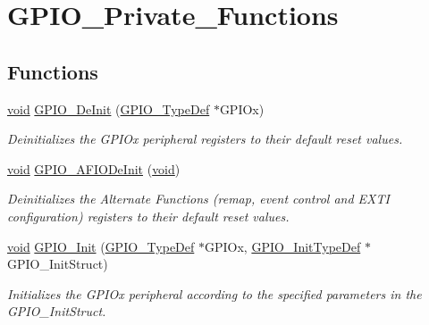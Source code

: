 \hypertarget{group___g_p_i_o___private___functions}{}\section{G\+P\+I\+O\+\_\+\+Private\+\_\+\+Functions}
\label{group___g_p_i_o___private___functions}
\subsection*{Functions}
\begin{DoxyCompactItemize}
\item 
\hyperlink{usb__devapi_8h_afabf60e7f57651d6d595a02c75f07cd0}{void} \hyperlink{group___g_p_i_o___private___functions_gaa60bdf3182c44b5fa818f237042f52ee}{G\+P\+I\+O\+\_\+\+De\+Init} (\hyperlink{struct_g_p_i_o___type_def}{G\+P\+I\+O\+\_\+\+Type\+Def} $\ast$G\+P\+I\+Ox)
\begin{DoxyCompactList}\small\item\em Deinitializes the G\+P\+I\+Ox peripheral registers to their default reset values. \end{DoxyCompactList}\item 
\hyperlink{usb__devapi_8h_afabf60e7f57651d6d595a02c75f07cd0}{void} \hyperlink{group___g_p_i_o___private___functions_ga7f645e6b6146818c3d6c19021e70170c}{G\+P\+I\+O\+\_\+\+A\+F\+I\+O\+De\+Init} (\hyperlink{usb__devapi_8h_afabf60e7f57651d6d595a02c75f07cd0}{void})
\begin{DoxyCompactList}\small\item\em Deinitializes the Alternate Functions (remap, event control and E\+X\+TI configuration) registers to their default reset values. \end{DoxyCompactList}\item 
\hyperlink{usb__devapi_8h_afabf60e7f57651d6d595a02c75f07cd0}{void} \hyperlink{group___g_p_i_o___private___functions_ga71abf9404261370d03cca449b88d3a65}{G\+P\+I\+O\+\_\+\+Init} (\hyperlink{struct_g_p_i_o___type_def}{G\+P\+I\+O\+\_\+\+Type\+Def} $\ast$G\+P\+I\+Ox, \hyperlink{struct_g_p_i_o___init_type_def}{G\+P\+I\+O\+\_\+\+Init\+Type\+Def} $\ast$G\+P\+I\+O\+\_\+\+Init\+Struct)
\begin{DoxyCompactList}\small\item\em Initializes the G\+P\+I\+Ox peripheral according to the specified parameters in the G\+P\+I\+O\+\_\+\+Init\+Struct. \end{DoxyCompactList}\item 

\end{DoxyCompactItemize}
